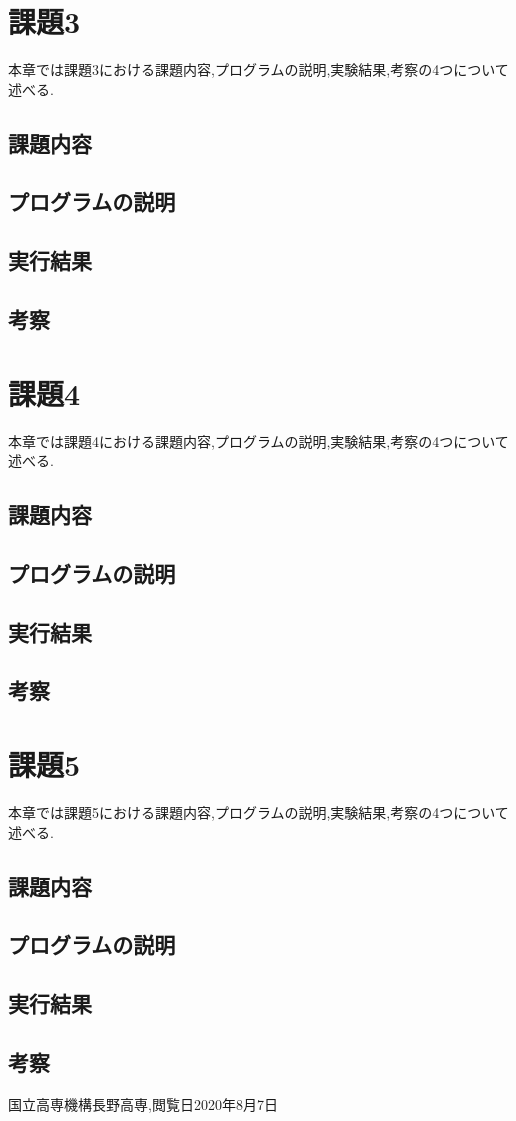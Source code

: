 \documentclass[dvipdfmx]{jarticle}
\begin{document}
    \section{課題3}
    本章では課題3における課題内容,プログラムの説明,実験結果,考察の4つについて述べる.
    \subsection{課題内容}
    \subsection{プログラムの説明}
    \subsection{実行結果}
    \subsection{考察}

    \section{課題4}
    本章では課題4における課題内容,プログラムの説明,実験結果,考察の4つについて述べる.
    \subsection{課題内容}
    \subsection{プログラムの説明}
    \subsection{実行結果}
    \subsection{考察}

    \section{課題5}
    本章では課題5における課題内容,プログラムの説明,実験結果,考察の4つについて述べる.
    \subsection{課題内容}
    \subsection{プログラムの説明}
    \subsection{実行結果}
    \subsection{考察}

        \begin{thebibliography}{9}
            国立高専機構長野高専,閲覧日2020年8月7日
          \end{thebibliography}
\end{document}
